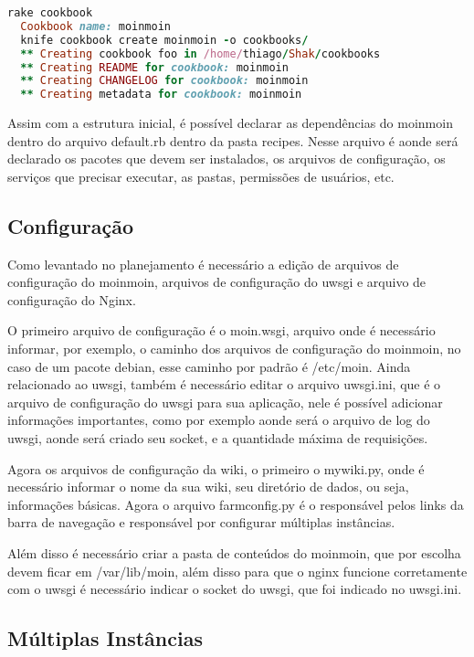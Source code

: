 \begin{lstlisting}[language=Ruby,label=dice_index,caption={Exemplo de criação de estrutura básica de livro de receitas do moinmoin com shak}]
  rake cookbook
  Cookbook name: moinmoin
  knife cookbook create moinmoin -o cookbooks/
  ** Creating cookbook foo in /home/thiago/Shak/cookbooks
  ** Creating README for cookbook: moinmoin
  ** Creating CHANGELOG for cookbook: moinmoin
  ** Creating metadata for cookbook: moinmoin
\end{lstlisting}

Assim com a estrutura inicial, é possível declarar as dependências do moinmoin
dentro do arquivo default.rb dentro da pasta recipes. Nesse arquivo é aonde
será declarado os pacotes que devem ser instalados, os arquivos de configuração,
os serviços que precisar executar, as pastas, permissões de usuários, etc.

\subsection{Configuração}

Como levantado no planejamento é necessário a edição de arquivos de configuração
do moinmoin, arquivos de configuração do uwsgi e arquivo de configuração
do Nginx.

O primeiro arquivo de configuração é o moin.wsgi, arquivo onde é necessário
informar, por exemplo, o caminho dos arquivos de configuração do moinmoin, no caso
de um pacote debian, esse caminho por padrão é  /etc/moin. Ainda relacionado
ao uwsgi, também é necessário editar o arquivo uwsgi.ini, que é o arquivo de configuração
do uwsgi para sua aplicação, nele é possível adicionar informações importantes, como
por exemplo aonde será o arquivo de log do uwsgi, aonde será criado seu socket,
e a quantidade máxima de requisições.

Agora os arquivos de configuração da wiki, o primeiro o mywiki.py, onde é necessário
informar o nome da sua wiki, seu diretório de dados, ou seja, informações básicas.
Agora o arquivo farmconfig.py é o responsável pelos links da barra de navegação
e responsável por configurar múltiplas instâncias.

Além disso é necessário criar a pasta de conteúdos do moinmoin, que por
escolha devem ficar em /var/lib/moin, além disso para que o nginx funcione corretamente
com o uwsgi é necessário indicar o socket do uwsgi, que foi indicado no uwsgi.ini.

\subsection{Múltiplas Instâncias}

